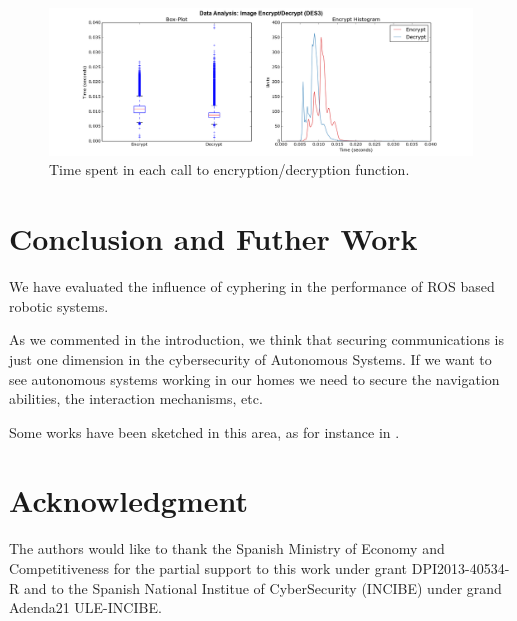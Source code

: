 \documentclass[journal,twoside]{JoPhA}
\begin{document}
\begin{figure}[ht!]
    \centering
    \includegraphics[width=.9\textwidth]{Outline_images_encryption_decrytiontime2.png}
    \caption{Time spent in each call to encryption/decryption function.}
  \label{fig:images_encryption}
\end{figure}



% 
% 
% 
% 
% 





\section{Conclusion and Futher Work}

We have evaluated the influence of cyphering in the performance of ROS based robotic systems.

As we commented in the introduction, we think that securing communications is just one dimension in  the cybersecurity of Autonomous Systems. If we want to see autonomous systems working in our homes we need to secure the navigation abilities, the interaction mechanisms, etc. 
 
Some works have been sketched in this area, as for instance in \cite{Guiochet2016}.




\section*{Acknowledgment}
The authors would  like to thank the Spanish Ministry of Economy and Competitiveness for the partial support to this work under grant DPI2013-40534-R and to the Spanish National Institue of CyberSecurity (INCIBE) under grand Adenda21 ULE-INCIBE.

 

\end{document}
